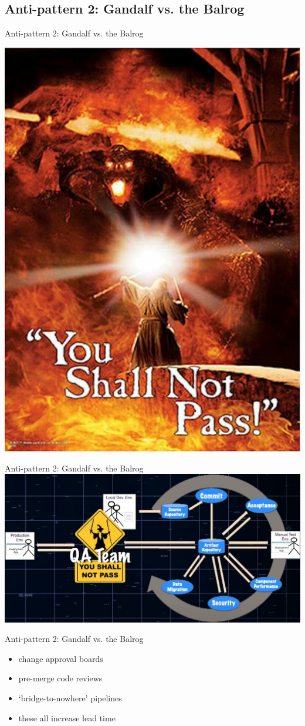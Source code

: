 \documentclass{beamer}
\begin{document}
	\subsection{Anti-pattern 2: Gandalf vs. the Balrog}
	\begin{frame}{Anti-pattern 2: Gandalf vs. the Balrog}
		\begin{center}
			\includegraphics[width=.5\textwidth]{gandalf-balrog}
		\end{center}
	\end{frame}
	\begin{frame}{Anti-pattern 2: Gandalf vs. the Balrog}
		\includegraphics[width=\textwidth]{gandalf}
	\end{frame}
	\begin{frame}{Anti-pattern 2: Gandalf vs. the Balrog}
		\begin{itemize}
			\item change approval boards \pause 
			\item pre-merge code reviews \pause 
			\item `bridge-to-nowhere' pipelines \pause
			\item these all increase lead time
		\end{itemize}
	\end{frame}
\end{document}
